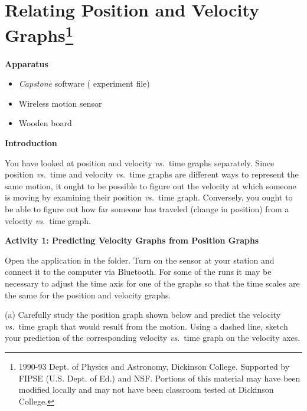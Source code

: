 
\section{Relating Position and Velocity Graphs\footnote{
1990-93 Dept. of Physics and Astronomy, Dickinson College. Supported by FIPSE
(U.S. Dept. of Ed.) and NSF. Portions of this material may have been modified
locally and may not have been classroom tested at Dickinson College.
}}

\makelabheader %

%

\bigskip

\textbf{Apparatus} 

\begin{itemize}[nosep]
\item \textit{Capstone} software ( experiment file)
\item Wireless motion sensor 
\item Wooden board
\end{itemize}

\bigskip
\textbf{Introduction} 

You have looked at position and velocity \textit{vs.}~time graphs separately. Since position
\textit{vs.}~time and velocity \textit{vs.}~time graphs are different ways to represent the same motion, it ought to be possible to figure out the velocity at which someone
is moving by examining their position \textit{vs.}~time graph. Conversely, you ought
to be able to figure out how far someone has traveled (change in position) from
a velocity \textit{vs.}~time graph.

\bigskip

\textbf{Activity 1: Predicting Velocity Graphs from Position Graphs} 

Open the  application in the \filename{\coursefolder} folder. Turn on the sensor at your station and connect it to the computer via Bluetooth. For some of the runs it may be necessary to adjust the time axis for one of the graphs so that the time scales are the same for the position and velocity graphs.

(a) Carefully study the position graph shown below and predict the velocity
\textit{vs.}~time graph that would result from the motion. Using a dashed line, sketch
your prediction of the corresponding velocity \textit{vs.}~time graph on the velocity
axes.


